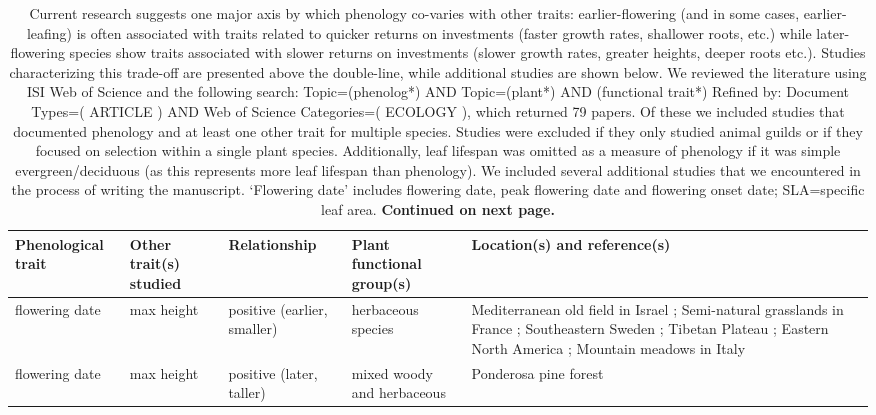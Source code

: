 \documentclass[11pt,a4paper,oneside]{article}
\begin{document}
\begin{center}  
\begin{table}
\caption{Current research suggests one major axis by which phenology co-varies with other traits: earlier-flowering (and in some cases, earlier-leafing) is often associated with traits related to quicker returns on investments (faster growth rates, shallower roots, etc.) while later-flowering species show traits associated with slower returns on investments (slower growth rates, greater heights, deeper roots etc.). Studies characterizing this trade-off are presented above the double-line, while additional studies are shown below. We reviewed the literature using ISI Web of Science and the following search: Topic=(phenolog*) AND Topic=(plant*) AND (functional trait*)
Refined by: Document Types=( ARTICLE ) AND Web of Science Categories=( ECOLOGY ), which returned 79 papers. Of these we included studies that documented phenology and at least one other trait for multiple species. Studies were excluded if they only studied animal guilds or if they focused on selection within a single plant species. Additionally, leaf lifespan was omitted as a measure of phenology if it was simple evergreen/deciduous (as this represents more leaf lifespan than phenology). We included several additional studies that we encountered in the process of writing the manuscript. `Flowering date' includes flowering date, peak flowering date and flowering onset date; SLA=specific leaf area. {\bf Continued on next page.}}
\vspace{1.5 pt}
\begin{minipage}{16cm}
\begin{tabular}{ | p{2cm} |  p{2.5 cm} | p{2.5 cm} | p{2.5 cm} | p{5cm} | }  \hline
Phenological trait & Other trait(s) studied  & Relationship & Plant functional group(s) & Location(s) and reference(s) \\ \hline \hline
flowering date	& max height & positive (earlier, smaller) & herbaceous species	& Mediterranean old field in Israel \citep{hadar1999}; Semi-natural grasslands in France \citep{Loualt2005,Vile:2006nc}; Southeastern Sweden \cite{Bolmgren:2008vo}; Tibetan Plateau \citep{du2010}; Eastern North America \citep{Sun:2011eu}; Mountain meadows in Italy \citep{Catorci2012} \\ \hline
flowering date	& max height & positive (later, taller) & mixed woody and herbaceous & Ponderosa pine forest \citep{Laughlin2010} \\ \hline

\end{tabular}
\end{minipage}
\end{table}
\end{center}
\end{document}
